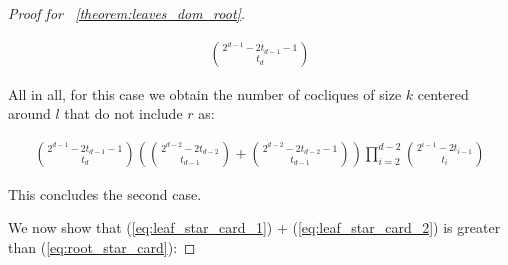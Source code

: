 \documentclass{amsart}
\theoremstyle{definition}
\begin{document}
\begin{proof}[Proof for ~\ref{theorem:leaves_dom_root}]
\begin{caseof}
		\begin{align*}
			\binom{2^{d - 1} - 2t_{d - 1} - 1}{t_d}
		\end{align*}

		All in all, for this case we obtain the number of cocliques of size $k$ centered around $l$ that do not include $r$ as:

		\begin{align}
			\binom{2^{d - 1} - 2t_{d - 1} - 1}{t_d}\left(\binom{2^{d - 2} - 2t_{d - 2}}{t_{d - 1}} + \binom{2^{d - 2} - 2t_{d - 2} - 1}{t_{d - 1}}\right)\displaystyle\prod_{i = 2}^{d - 2}\binom{2^{i - 1} - 2t_{i - 1}}{t_i}\label{eq:leaf_star_card_2}
		\end{align}

		This concludes the second case.
	\end{caseof}


	We now show that (\ref{eq:leaf_star_card_1}) + (\ref{eq:leaf_star_card_2}) is greater than (\ref{eq:root_star_card}):
\end{proof}
\end{document}
